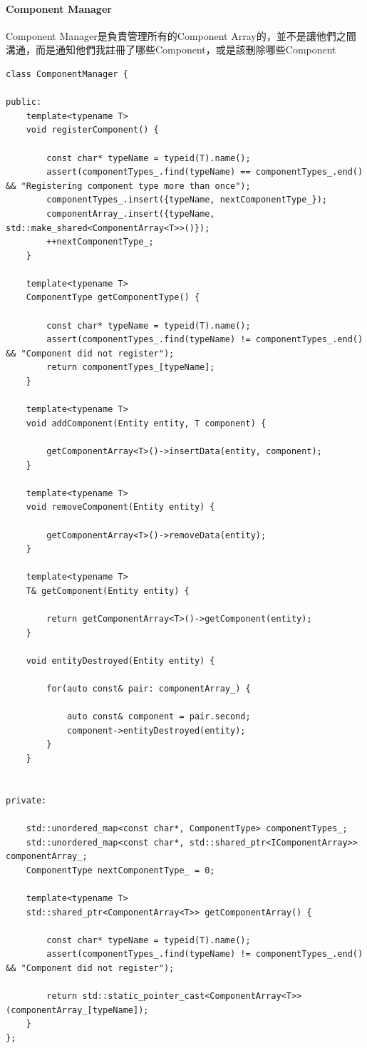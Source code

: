 \paragraph{Component Manager}

Component Manager是負責管理所有的Component Array的，並不是讓他們之間溝通，而是通知他們我註冊了哪些Component，或是該刪除哪些Component

\begin{lstlisting}
class ComponentManager {

public:
    template<typename T>
    void registerComponent() {

        const char* typeName = typeid(T).name();
        assert(componentTypes_.find(typeName) == componentTypes_.end() && "Registering component type more than once");
        componentTypes_.insert({typeName, nextComponentType_});
        componentArray_.insert({typeName, std::make_shared<ComponentArray<T>>()});
        ++nextComponentType_;
    }

    template<typename T>
    ComponentType getComponentType() {

        const char* typeName = typeid(T).name();
        assert(componentTypes_.find(typeName) != componentTypes_.end() && "Component did not register");
        return componentTypes_[typeName];
    }

    template<typename T>
    void addComponent(Entity entity, T component) {

        getComponentArray<T>()->insertData(entity, component);
    }

    template<typename T>
    void removeComponent(Entity entity) {

        getComponentArray<T>()->removeData(entity);
    }

    template<typename T>
    T& getComponent(Entity entity) {

        return getComponentArray<T>()->getComponent(entity);
    }

    void entityDestroyed(Entity entity) {

        for(auto const& pair: componentArray_) {

            auto const& component = pair.second;
            component->entityDestroyed(entity);
        }
    }


private:

    std::unordered_map<const char*, ComponentType> componentTypes_;
    std::unordered_map<const char*, std::shared_ptr<IComponentArray>> componentArray_;
    ComponentType nextComponentType_ = 0;

    template<typename T>
    std::shared_ptr<ComponentArray<T>> getComponentArray() {

        const char* typeName = typeid(T).name();
        assert(componentTypes_.find(typeName) != componentTypes_.end() && "Component did not register");

        return std::static_pointer_cast<ComponentArray<T>>(componentArray_[typeName]);
    }
};
\end{lstlisting}


